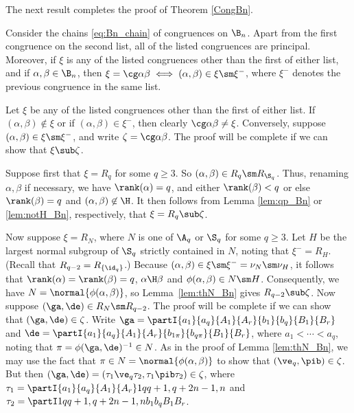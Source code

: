 The next result completes the proof of Theorem \ref{CongBn}. 

%
\begin{prop}\label{prop:chain_Bn}
Consider the chains \eqref{eq:Bn_chain} of congruences on $\B_n$.
%
Apart from the first congruence on the second list, all of the listed congruences are principal.  Moreover, if $\xi$ is any of the listed congruences other than the first of either list, and if $\alpha,\beta\in\B_n$, then $\xi=\cg\alpha\beta\iff(\alpha,\beta)\in\xi\sm\xi^-$, where $\xi^-$ denotes the previous congruence in the same list.
\end{prop}

\pf Let $\xi$ be any of the listed congruences other than the first of either
list.  If $(\alpha,\beta)\not\in\xi$ or if $(\alpha,\beta)\in\xi^-$, then clearly
$\cg\alpha\beta\not=\xi$.  Conversely, suppose $(\alpha,\beta)\in\xi\sm\xi^-$, and write $\zeta=\cg\alpha\beta$.  The proof will be complete if we can show that $\xi\sub\zeta$.  

\bigskip{}  Suppose first that $\xi=R_q$ for some $q\geq3$.  So $(\alpha,\beta)\in R_q\sm R_{\S_q}$.  Thus, renaming $\alpha,\beta$ if necessary, we have $\rank(\alpha)=q$, and either $\rank(\beta)<q$ or else $\rank(\beta)=q$ and $(\alpha,\beta)\not\in{\H}$.  It then follows from Lemma \ref{lem:qp_Bn} or \ref{lem:notH_Bn}, respectively, that $\xi=R_q\sub\zeta$.

\bigskip{}  Now suppose $\xi=R_{N}$, where $N$ is one of $\A_q$ or $\S_q$ for some $q\geq3$.  Let $H$ be the largest normal subgroup of $\S_q$ strictly contained in $N$,
noting that $\xi^-=R_H$.  (Recall that $R_{q-2}=R_{\{\id_q\}}$.)  Because
$(\alpha,\beta)\in\xi\sm\xi^-=\nu_N\sm\nu_H$, it follows that $\rank(\alpha)=\rank(\beta)=q$,
$\alpha\H\beta$ and $\phi(\alpha,\beta)\in N\sm H$.  Consequently, we have
$N=\normal{\phi(\alpha,\beta)}$, so Lemma~\ref{lem:thN_Bn} gives $R_{q-2}\sub\zeta$.
Now suppose $(\ga,\de)\in R_N\sm R_{q-2}$.  The proof will be complete if we can show that $(\ga,\de)\in\zeta$.  Write $\ga=
\partI{a_1}{a_q}{A_1}{A_r}{b_1}{b_q}{B_1}{B_r}$ and $\de=\partI{a_1}{a_q}{A_1}{A_r}{b_{1\pi}}{b_{q\pi}}{B_1}{B_r}$, where $a_1<\cdots<a_q$, noting that $\pi=\phi(\ga,\de)^{-1}\in N$.  As in the proof of Lemma \ref{lem:thN_Bn}, we may use the fact that $\pi\in N=\normal{\phi(\alpha,\beta)}$ to show that $(\ve_q,\pib)\in\zeta$.  But then $(\ga,\de)=(\tau_1\ve_q\tau_2,\tau_1\pib\tau_2)\in\zeta$, where $\tau_1=\partI{a_1}{a_q}{A_1}{A_r}1q{q+1,q+2}{n-1,n}$ and $\tau_2=\partI1q{q+1,q+2}{n-1,n}{b_1}{b_q}{B_1}{B_r}$. \epf





